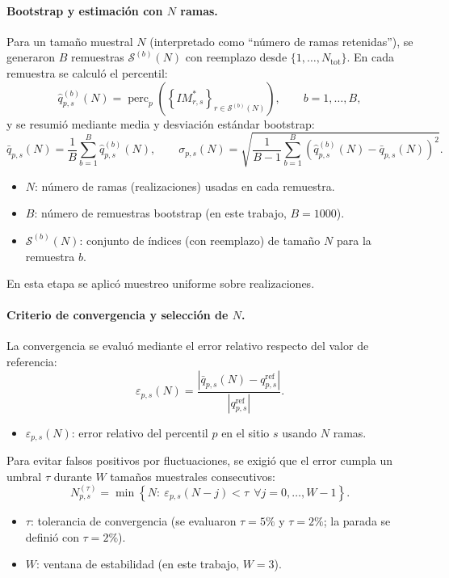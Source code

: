 \paragraph{Bootstrap y estimación con $N$ ramas.}
Para un tamaño muestral $N$ (interpretado como “número de ramas retenidas”), se generaron $B$ remuestras $\mathcal{S}^{(b)}(N)$ con reemplazo desde $\{1,\dots,N_{\mathrm{tot}}\}$. En cada remuestra se calculó el percentil:
\begin{equation}
\hat{q}^{(b)}_{p,s}(N)=\operatorname{perc}_{p}\!\left(\left\{IM^\ast_{r,s}\right\}_{r\in \mathcal{S}^{(b)}(N)}\right),
\qquad b=1,\dots,B,
\end{equation}
y se resumió mediante media y desviación estándar bootstrap:
\begin{equation}
\bar{q}_{p,s}(N)=\frac{1}{B}\sum_{b=1}^{B}\hat{q}^{(b)}_{p,s}(N),
\qquad
\sigma_{p,s}(N)=\sqrt{\frac{1}{B-1}\sum_{b=1}^{B}\left(\hat{q}^{(b)}_{p,s}(N)-\bar{q}_{p,s}(N)\right)^{2}}.
\end{equation}
\begin{itemize}
  \item $N$: número de ramas (realizaciones) usadas en cada remuestra.
  \item $B$: número de remuestras bootstrap (en este trabajo, $B=1000$).
  \item $\mathcal{S}^{(b)}(N)$: conjunto de índices (con reemplazo) de tamaño $N$ para la remuestra $b$.
\end{itemize}

En esta etapa se aplicó muestreo uniforme sobre realizaciones.

\paragraph{Criterio de convergencia y selección de $N$.}
La convergencia se evaluó mediante el error relativo respecto del valor de referencia:
\begin{equation}
\varepsilon_{p,s}(N)=\frac{\left|\bar{q}_{p,s}(N)-q^{\mathrm{ref}}_{p,s}\right|}{\left|q^{\mathrm{ref}}_{p,s}\right|}.
\end{equation}
\begin{itemize}
  \item $\varepsilon_{p,s}(N)$: error relativo del percentil $p$ en el sitio $s$ usando $N$ ramas.
\end{itemize}

Para evitar falsos positivos por fluctuaciones, se exigió que el error cumpla un umbral $\tau$ durante $W$ tamaños muestrales consecutivos:
\begin{equation}
N^{(\tau)}_{p,s}=\min\left\{N:\ \varepsilon_{p,s}(N-j)<\tau\ \ \forall j=0,\dots,W-1\right\}.
\end{equation}
\begin{itemize}
  \item $\tau$: tolerancia de convergencia (se evaluaron $\tau=5\%$ y $\tau=2\%$; la parada se definió con $\tau=2\%$).
  \item $W$: ventana de estabilidad (en este trabajo, $W=3$).
\end{itemize}

